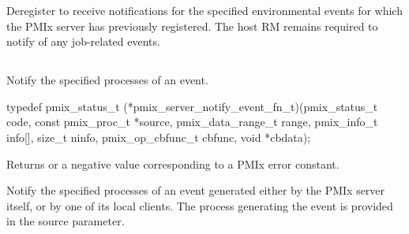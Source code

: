 Deregister to receive notifications for the specified environmental events for which the PMIx server has previously registered.
The host RM remains required to notify of any job-related events.


\subsection{}

\summary

Notify the specified processes of an event.

\format

\cspecificstart
\begin{codepar}
typedef pmix_status_t (*pmix_server_notify_event_fn_t)(pmix_status_t code,
                                                       const pmix_proc_t *source,
                                                       pmix_data_range_t range,
                                                       pmix_info_t info[], size_t ninfo,
                                                       pmix_op_cbfunc_t cbfunc, void *cbdata);
\end{codepar}
\cspecificend

\begin{arglist}
\end{arglist}

Returns  or a negative value corresponding to a PMIx error constant.

\descr

Notify the specified processes of an event generated either by the PMIx server itself, or by one of its local clients.
The process generating the event is provided in the source parameter.


\subsection{}

